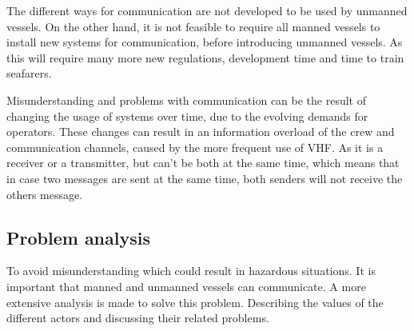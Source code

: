 The different ways for communication are not developed to be used by unmanned vessels. On the other hand, it is not feasible to require all manned vessels to install new systems for communication, before introducing unmanned vessels. As this will require many more new regulations, development time and time to train seafarers.

Misunderstanding and problems with communication can be the result of changing the usage of systems over time, due to the evolving demands for operators. These changes can result in an information overload of the crew and communication channels, caused by the more frequent use of \ac{VHF}. As it is a receiver or a transmitter, but can't be both at the same time, which means that in case two messages are sent at the same time, both senders will not receive the others message.

\subsection{Problem analysis}
To avoid misunderstanding which could result in hazardous situations. It is important that manned and unmanned vessels can communicate. A more extensive analysis is made to solve this problem. 
Describing the values of the different actors and discussing their related problems.

